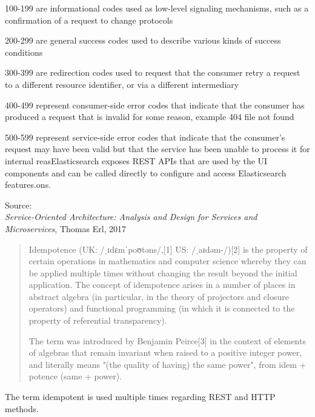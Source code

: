 \documentclass[Screen16to9,17pt]{foils}
\begin{document}
\begin{list2}
\item 100-199 are informational codes used as low-level signaling mechanisms, such as a confirmation of a request to change protocols
\item 200-299 are general success codes used to describe various kinds of success conditions
\item 300-399 are redirection codes used to request that the consumer retry a request to a different resource identifier, or via a different intermediary
\item 400-499 represent consumer-side error codes that indicate that the consumer has produced a request that is invalid for some reason, example 404 file not found
\item 500-599 represent service-side error codes that indicate that the consumer’s request may have been valid but that the service has been unable to process it for internal reasElasticsearch exposes REST APIs that are used by the UI components and can be called directly to configure and access Elasticsearch features.ons.
\end{list2}
Source: {\footnotesize\\
\emph{Service‑Oriented Architecture: Analysis and Design for Services and Microservices}, Thomas Erl, 2017}



\begin{quote}
Idempotence (UK: /ˌɪdɛmˈpoʊtəns/,[1] US: /ˌaɪdəm-/)[2] is the property of certain operations in mathematics and computer science whereby they can be applied multiple times without changing the result beyond the initial application. The concept of idempotence arises in a number of places in abstract algebra (in particular, in the theory of projectors and closure operators) and functional programming (in which it is connected to the property of referential transparency).

The term was introduced by Benjamin Peirce[3] in the context of elements of algebras that remain invariant when raised to a positive integer power, and literally means "(the quality of having) the same power", from idem + potence (same + power).
\end{quote}

\begin{list2}
\item The term idempotent is used multiple times regarding REST and HTTP methods.
\end{list2}
\end{document}
